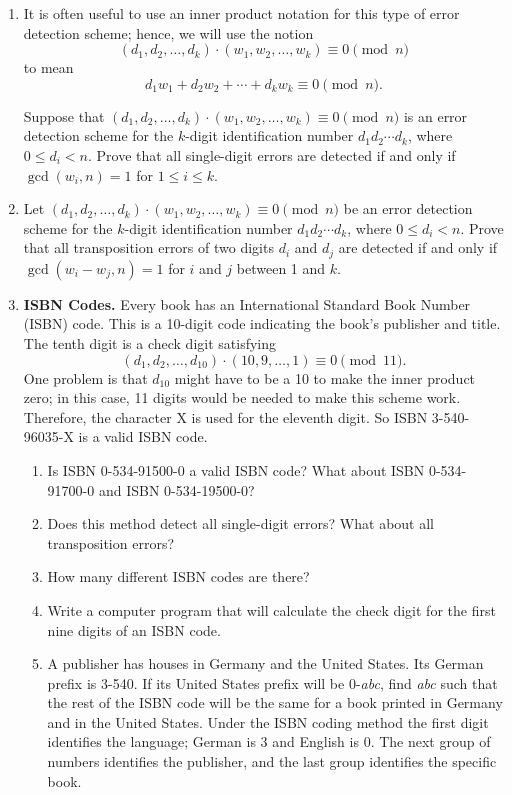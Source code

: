 {\begin{enumerate}
\item
It is often useful to use an inner product notation for this type of error detection scheme; hence, we will use the notion
$$
(d_1, d_2, \ldots, d_k ) \cdot (w_1, w_2, \ldots, w_k ) \equiv 0 \pmod{ n }
$$
to mean
$$
d_1 w_1 +  d_2 w_2 + \cdots +  d_k w_k  \equiv 0  \pmod{ n}.
$$

Suppose that $(d_1, d_2, \ldots, d_k ) \cdot (w_1, w_2, \ldots, w_k ) \equiv 0 \pmod{ n}$ is an error detection scheme for the $k$-digit identification number $d_1 d_2 \cdots d_k$, where $0 \leq d_i < n$.  Prove that all single-digit errors are detected if and only if $\gcd( w_i, n ) = 1$ for  $1 \leq i \leq k$. 

\item
Let $(d_1, d_2, \ldots, d_k ) \cdot (w_1, w_2, \ldots, w_k ) \equiv 0 \pmod{ n}$ be an error detection scheme for the $k$-digit identification number $d_1 d_2 \cdots d_k$, where $0 \leq d_i < n$.  Prove that all transposition errors of two digits $d_i$ and $d_j$ are detected if and only if $\gcd( w_i - w_j, n ) = 1$ for $i$ and  $j$ between 1 and $k$. 

\item
{\bf ISBN Codes.} 
Every book has an International Standard Book Number (ISBN) code.  This is a 10-digit code indicating the book's publisher and title.  The tenth digit is a check digit satisfying 
$$
(d_1, d_2, \ldots, d_{10} ) \cdot (10, 9, \ldots, 1 )  \equiv 0 \pmod{11}.
$$
One problem is that $d_{10}$ might have to be a 10 to make the inner product zero; in this case, 11 digits would be  needed to make this scheme work.  Therefore, the character X is used for the eleventh digit.  So ISBN 3-540-96035-X is a valid ISBN code. 
\begin{enumerate}
 
 \item
Is ISBN 0-534-91500-0 a valid ISBN code?  What about ISBN 0-534-91700-0 and ISBN 0-534-19500-0? 
 
 \item
Does this method detect all single-digit errors?  What about all transposition errors? 
 
 \item
How many different ISBN codes are there?
 
 \item
Write a computer program that will calculate the check digit for the first nine digits of an ISBN code. 
 
 \item
A publisher has houses in Germany and the United States.  Its German prefix is 3-540.  If its United States prefix will be 0-{\it abc}, find {\it abc} such that the rest of the ISBN code will be the same for a book printed in Germany and in the United States. Under the ISBN coding method the first digit identifies the language; German is  3 and English is  0.  The next group of numbers identifies the publisher, and the last group identifies the specific book. 
 
\end{enumerate}
 
\end{enumerate}
}
 
